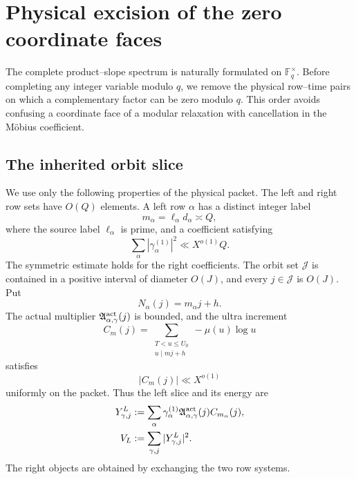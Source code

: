 \section{Physical excision of the zero coordinate faces}
\label{sec:tpc37-physical-zero-faces}

The complete product--slope spectrum is naturally formulated on
\(\mathbb F_q^\times\).  Before completing any integer variable modulo
\(q\), we remove the physical row--time pairs on which a complementary
factor can be zero modulo \(q\).  This order avoids confusing a coordinate
face of a modular relaxation with cancellation in the M\"obius
coefficient.

\subsection{The inherited orbit slice}

We use only the following properties of the physical packet.  The left
and right row sets have \(O(Q)\) elements.  A left row \(\alpha\) has a
distinct integer label
\begin{equation}
 m_\alpha=\ell_\alpha d_\alpha\asymp Q,
 \label{eq:tpc37-row-label}
\end{equation}
where the source label \(\ell_\alpha\) is prime, and a coefficient
satisfying
\begin{equation}
 \sum_\alpha |\gamma_\alpha^{(1)}|^2
 \ll X^{o(1)}Q.
 \label{eq:tpc37-left-row-energy}
\end{equation}
The symmetric estimate holds for the right coefficients.  The orbit set
\(\mathcal J\) is contained in a positive interval of diameter
\(O(J)\), and every \(j\in\mathcal J\) is \(O(J)\).  Put
\begin{equation}
 N_\alpha(j)=m_\alpha j+h.
 \label{eq:tpc37-target}
\end{equation}
The actual multiplier
\(\mathfrak A_{\alpha,\gamma}^{\rm act}(j)\) is bounded, and the ultra
increment
\begin{equation}
 C_m(j)=
 \sum_{\substack{T<u\le U_0\\u\mid mj+h}}
 -\mu(u)\log u
 \label{eq:tpc37-ultra-increment}
\end{equation}
satisfies
\begin{equation}
 |C_m(j)|\ll X^{o(1)}
 \label{eq:tpc37-ultra-envelope}
\end{equation}
uniformly on the packet.  Thus the left slice and its energy are
\begin{align}
 Y_{\gamma,j}^L
 &:=\sum_\alpha \gamma_\alpha^{(1)}
 \mathfrak A_{\alpha,\gamma}^{\rm act}(j)C_{m_\alpha}(j),
 \label{eq:tpc37-left-slice}\\
 V_L&:=\sum_{\gamma,j}|Y_{\gamma,j}^L|^2.
 \label{eq:tpc37-left-energy}
\end{align}
The right objects are obtained by exchanging the two row systems.

